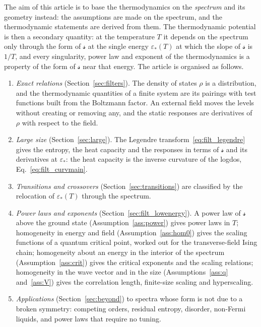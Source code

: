 \documentclass[10pt,a4paper]{article}
\theoremstyle{plain}
\newcommand{\lndos}{{logdos}}  %
\newcommand{\lds}{\mathscr{s}}  %
\begin{document}
The aim of this article is to base the thermodynamics on the \emph{spectrum}
and its geometry instead: the assumptions are made on the spectrum, and the
thermodynamic statements are derived from them. The thermodynamic
potential is then a secondary quantity: at the temperature $T$ it depends on
the spectrum only through the form of $\lds$ at the single energy
$\varepsilon_*(T)$ at which the slope of $\lds$ is $1/T$, and every
singularity, power law and exponent of the thermodynamics is a property of
the form of $\lds$ near that energy. The article is organised as follows.
\begin{enumerate}[label=(\roman*),itemsep=2pt]
\item \emph{Exact relations} (Section~\ref{sec:filters}). The density of
  states $\rho$ is a distribution, and the thermodynamic quantities of a
  finite system are its pairings with test functions built from the
  Boltzmann factor. An external field moves the levels without creating or removing
  any, and the static responses are derivatives of $\rho$ with respect to
  the field.
\item \emph{Large size} (Section~\ref{sec:large}). The Legendre
  transform~\eqref{eq:filt_legendre} gives the entropy, the heat capacity
  and the responses in terms of $\lds$ and its derivatives at
  $\varepsilon_*$: the heat capacity is the inverse curvature of the \lndos,
  Eq.~\eqref{eq:filt_curvmain}.
\item \emph{Transitions and crossovers} (Section~\ref{sec:transitions}) are
  classified by the relocation of $\varepsilon_*(T)$ through the spectrum.
\item \emph{Power laws and exponents} (Section~\ref{sec:filt_lowenergy}). A
  power law of $\lds$ above the ground state (Assumption~\ref{ass:power})
  gives power laws in $T$; homogeneity in energy and field
  (Assumption~\ref{ass:hom0}) gives the scaling functions of a quantum
  critical point, worked out for the transverse-field Ising chain;
  homogeneity about an energy in the interior of the
  spectrum (Assumption~\ref{ass:crit}) gives the critical exponents and the
  scaling relations; homogeneity in the wave vector and in the size
  (Assumptions~\ref{ass:q} and~\ref{ass:V}) gives the correlation length,
  finite-size scaling and hyperscaling.
\item \emph{Applications} (Section~\ref{sec:beyond}) to spectra whose form is
  not due to a broken symmetry: competing orders, residual entropy,
  disorder, non-Fermi liquids, and power laws that require no tuning.
\end{enumerate}
\end{document}

